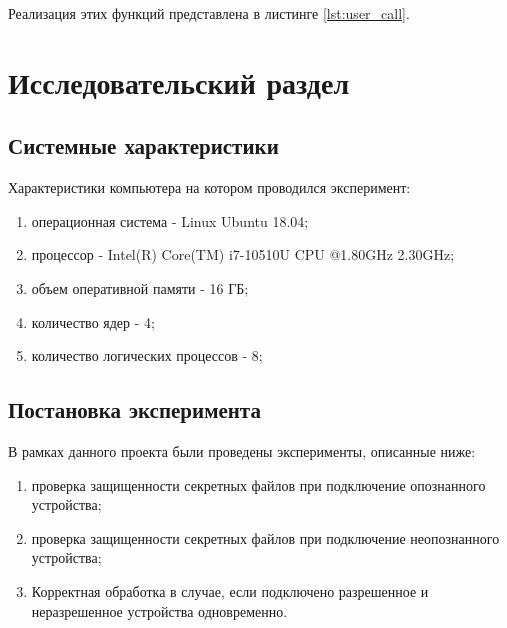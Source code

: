 \documentclass[a4paper, 10pt]{article}
\begin{document}
	Реализация этих функций представлена в листинге \ref{lst:user_call}.
	
\clearpage
\newpage
\section{Исследовательский раздел }
	\subsection{Системные характеристики}
	Характеристики компьютера на котором проводился эксперимент:
	\begin{enumerate}
		\item операционная система - Linux Ubuntu 18.04;
		\item процессор - Intel(R) Core(TM) i7-10510U CPU @1.80GHz 2.30GHz;
		\item объем оперативной памяти - 16 ГБ;
		\item количество ядер - 4;
		\item количество логических процессов - 8;
	\end{enumerate}
	\subsection{Постановка эксперимента}
	В рамках данного проекта были проведены эксперименты, описанные ниже:
	\begin{enumerate}
		\item проверка защищенности секретных файлов при подключение опознанного устройства;
		\item проверка защищенности секретных файлов при подключение неопознанного устройства;
		\item Корректная обработка в случае, если подключено разрешенное и неразрешенное устройства одновременно.
	\end{enumerate}
\end{document}
